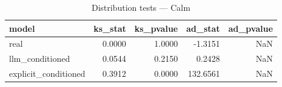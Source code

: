 \begin{table}
\caption{Distribution tests — Calm}
\label{tab:dist_Calm}
\begin{tabular}{lrrrr}
\toprule
model & ks\_stat & ks\_pvalue & ad\_stat & ad\_pvalue \\
\midrule
real & 0.0000 & 1.0000 & -1.3151 & NaN \\
llm\_conditioned & 0.0544 & 0.2150 & 0.2428 & NaN \\
explicit\_conditioned & 0.3912 & 0.0000 & 132.6561 & NaN \\
\bottomrule
\end{tabular}
\end{table}
